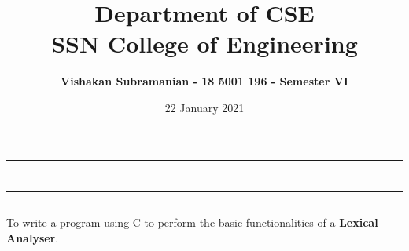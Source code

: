 \documentclass[12pt, a4]{article}
\title{\textbf{Department of CSE\\SSN College of Engineering}}
\author{\textbf{Vishakan Subramanian - 18 5001 196 - Semester VI}}
\date{22 January 2021}
\begin{document}
\maketitle
\hrule
\section*{}
\hrule
\bigskip

\subsection*{}
\subsection*{}
\begin{flushleft}
To write a program using C to perform the
basic functionalities of a \textbf{Lexical Analyser}.
\end{flushleft}

\newpage
\subsection*{}
\begin{flushleft}

\end{flushleft}

\newpage
\subsection*{}
\begin{flushleft}

\end{flushleft}
\end{document}
